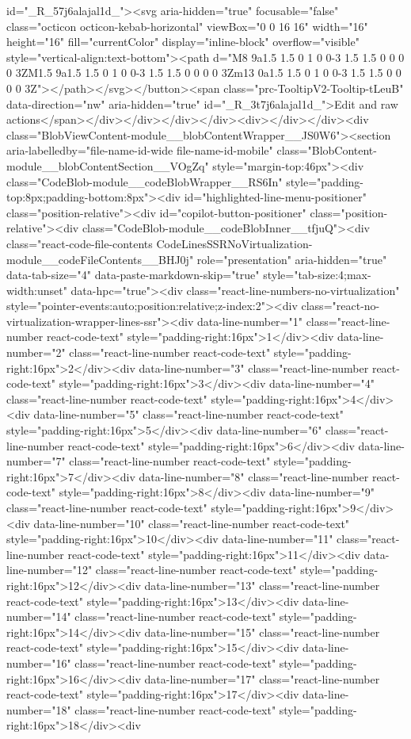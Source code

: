 {{{{{{{id="_R_57j6alajal1d_"><svg aria-hidden="true" focusable="false" class="octicon octicon-kebab-horizontal" viewBox="0 0 16 16" width="16" height="16" fill="currentColor" display="inline-block" overflow="visible" style="vertical-align:text-bottom"><path d="M8 9a1.5 1.5 0 1 0 0-3 1.5 1.5 0 0 0 0 3ZM1.5 9a1.5 1.5 0 1 0 0-3 1.5 1.5 0 0 0 0 3Zm13 0a1.5 1.5 0 1 0 0-3 1.5 1.5 0 0 0 0 3Z"></path></svg></button><span class="prc-TooltipV2-Tooltip-tLeuB" data-direction="nw" aria-hidden="true" id="_R_3t7j6alajal1d_">Edit and raw actions</span></div></div></div></div><div></div></div><div class="BlobViewContent-module__blobContentWrapper__JS0W6"><section aria-labelledby="file-name-id-wide file-name-id-mobile" class="BlobContent-module__blobContentSection__VOgZq" style="margin-top:46px"><div class="CodeBlob-module__codeBlobWrapper__RS6In" style="padding-top:8px;padding-bottom:8px"><div id="highlighted-line-menu-positioner" class="position-relative"><div id="copilot-button-positioner" class="position-relative"><div class="CodeBlob-module__codeBlobInner__tfjuQ"><div class="react-code-file-contents CodeLinesSSRNoVirtualization-module__codeFileContents__BHJ0j" role="presentation" aria-hidden="true" data-tab-size="4" data-paste-markdown-skip="true" style="tab-size:4;max-width:unset" data-hpc="true"><div class="react-line-numbers-no-virtualization" style="pointer-events:auto;position:relative;z-index:2"><div class="react-no-virtualization-wrapper-lines-ssr"><div data-line-number="1" class="react-line-number react-code-text" style="padding-right:16px">1</div><div data-line-number="2" class="react-line-number react-code-text" style="padding-right:16px">2</div><div data-line-number="3" class="react-line-number react-code-text" style="padding-right:16px">3</div><div data-line-number="4" class="react-line-number react-code-text" style="padding-right:16px">4</div><div data-line-number="5" class="react-line-number react-code-text" style="padding-right:16px">5</div><div data-line-number="6" class="react-line-number react-code-text" style="padding-right:16px">6</div><div data-line-number="7" class="react-line-number react-code-text" style="padding-right:16px">7</div><div data-line-number="8" class="react-line-number react-code-text" style="padding-right:16px">8</div><div data-line-number="9" class="react-line-number react-code-text" style="padding-right:16px">9</div><div data-line-number="10" class="react-line-number react-code-text" style="padding-right:16px">10</div><div data-line-number="11" class="react-line-number react-code-text" style="padding-right:16px">11</div><div data-line-number="12" class="react-line-number react-code-text" style="padding-right:16px">12</div><div data-line-number="13" class="react-line-number react-code-text" style="padding-right:16px">13</div><div data-line-number="14" class="react-line-number react-code-text" style="padding-right:16px">14</div><div data-line-number="15" class="react-line-number react-code-text" style="padding-right:16px">15</div><div data-line-number="16" class="react-line-number react-code-text" style="padding-right:16px">16</div><div data-line-number="17" class="react-line-number react-code-text" style="padding-right:16px">17</div><div data-line-number="18" class="react-line-number react-code-text" style="padding-right:16px">18</div><div }}}}}}}
